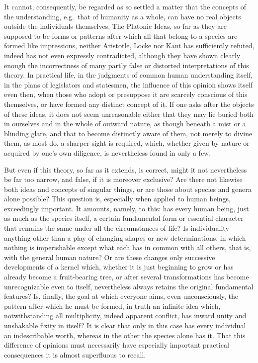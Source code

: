 \documentclass[12pt,a4paper,openany]{book}
\newcommand{\opage}[1]{\marginnote{\footnotesize\textit{[#1]}}}
\begin{document}
It cannot, consequently, be regarded as so settled a matter that the concepts of
the understanding, e.g.\ that of humanity as a whole, can have no real objects
outside the individuals themselves. The Platonic Ideas, so far as they are supposed
to be forms or patterns after which all that belong to a species are formed like
impressions, neither Aristotle, Locke nor Kant has sufficiently refuted, indeed
has not even expressly contradicted, although they have shown clearly enough the
incorrectness of many partly false or distorted interpretations of this theory. In
practical life, in the judgments of common human understanding itself, in the plans
of legislators and statesmen, the influence of this opinion shows itself even
then, when those who adopt or presuppose it are scarcely conscious of this
themselves, or have formed any distinct concept of it. If one asks after the
objects of these ideas, it does not seem unreasonable either that they may lie
buried both in ourselves and in the whole of outward nature, as though beneath a
mist or a blinding glare, and that to become distinctly aware of them, not merely
to divine them, as most do, a sharper sight is required, which, whether given by
nature or acquired by one's own diligence, is nevertheless found in only a few.

But even if this theory, so far as it extends, is correct, might it not
nevertheless be far too narrow, and false, if it is moreover exclusive? Are there
not likewise both ideas and concepts of singular things, or are those about
\setcounter{footnote}{0}%
\opage{103}species and genera alone possible? This question is, especially when applied to
human beings, exceedingly important. It amounts, namely, to this: has every human
being, just as much as the species itself, a certain fundamental form or essential
character that remains the same under all the circumstances of life? Is
individuality anything other than a play of changing shapes or new determinations,
in which nothing is imperishable except what each has in common with all others,
that is, with the general human nature? Or are these changes only successive
developments of a kernel which, whether it is just beginning to grow or has
already become a fruit-bearing tree, or after several transformations has become
unrecognizable even to itself, nevertheless always retains the original
fundamental features? Is, finally, the goal at which everyone aims, even
unconsciously, the pattern after which he must be formed, in truth an infinite
idea which, notwithstanding all multiplicity, indeed apparent conflict, has
inward unity and unshakable fixity in itself? It is clear that only in this case
has every individual an indescribable worth, whereas in the other the species
alone has it. That this difference of opinions must necessarily have especially
important practical consequences it is almost superfluous to recall.
\end{document}
